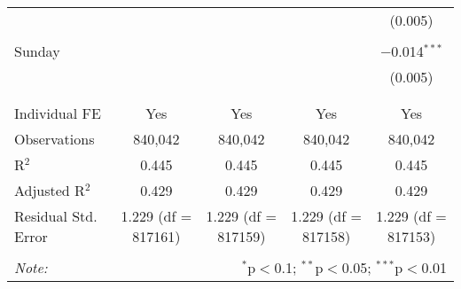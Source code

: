 \documentclass[
]{article}
\begin{document}
\begin{table}[!htbp]
{\begin{tabular}{@{\extracolsep{5pt}}lcccc}
  &  &  &  & (0.005) \\ 
  & & & & \\ 
 Sunday &  &  &  & $-$0.014$^{***}$ \\ 
  &  &  &  & (0.005) \\ 
  & & & & \\ 
\hline \\[-1.8ex] 
Individual FE & Yes & Yes & Yes & Yes \\ 
Observations & 840,042 & 840,042 & 840,042 & 840,042 \\ 
R$^{2}$ & 0.445 & 0.445 & 0.445 & 0.445 \\ 
Adjusted R$^{2}$ & 0.429 & 0.429 & 0.429 & 0.429 \\ 
Residual Std. Error & 1.229 (df = 817161) & 1.229 (df = 817159) & 1.229 (df = 817158) & 1.229 (df = 817153) \\ 
\hline 
\hline \\[-1.8ex] 
\textit{Note:}  & \multicolumn{4}{r}{$^{*}$p$<$0.1; $^{**}$p$<$0.05; $^{***}$p$<$0.01} \\ 
\end{tabular}
} 
\end{table} 
\newpage
\end{document}

